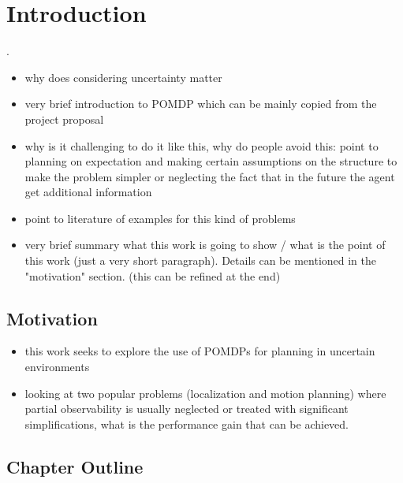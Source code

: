 \chapter{Introduction}\label{chap:introduction}

.
\begin{itemize}
  \item why does considering uncertainty matter
  \item very brief introduction to POMDP which can be mainly copied from the project proposal
  \item why is it challenging to do it like this, why do people avoid this:
        point to planning on expectation and making certain assumptions on the structure to
        make the problem simpler or neglecting the fact that
        in the future the agent get additional information
  \item point to literature of examples for this kind of problems
  \item very brief summary what this work is going to show / what is the point
        of this work (just a very short paragraph). Details can be mentioned in the
        "motivation" section. (this can be refined at the end)
\end{itemize}

\section{Motivation}


\begin{itemize}
  \item this work seeks to explore the use of POMDPs for planning in uncertain environments
  \item looking at two popular problems (localization and motion planning)
  where partial observability is usually neglected or treated with significant
  simplifications, what is the performance gain that can be achieved.
\end{itemize}

\section{Chapter Outline}


